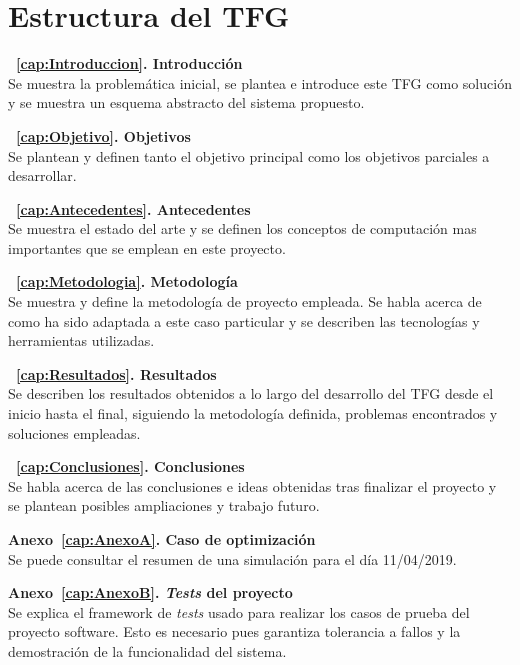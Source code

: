 \section{Estructura del TFG}
\begin{description}
\item \textbf{~\ref{cap:Introduccion}. Introducción}\\
  Se muestra la problemática inicial, se plantea e introduce este \gls{TFG} como solución y se muestra un esquema abstracto del sistema propuesto.
\item \textbf{~\ref{cap:Objetivo}. Objetivos}\\
  Se plantean y definen tanto el objetivo principal como los objetivos parciales a desarrollar.
\item \textbf{~\ref{cap:Antecedentes}. Antecedentes}\\
  Se muestra el estado del arte y se definen los conceptos de computación mas importantes que se emplean en este proyecto.
\item \textbf{~\ref{cap:Metodologia}. Metodología}\\
  Se muestra y define la metodología de proyecto empleada. Se habla acerca de como ha sido adaptada a este caso particular y se describen las tecnologías y herramientas utilizadas.
\item \textbf{~\ref{cap:Resultados}. Resultados}\\
  Se describen los resultados obtenidos a lo largo del desarrollo del \gls{TFG} desde el inicio hasta el final, siguiendo la metodología definida, problemas encontrados y soluciones empleadas.
\item \textbf{~\ref{cap:Conclusiones}. Conclusiones}\\
  Se habla acerca de las conclusiones e ideas obtenidas tras finalizar el proyecto y se plantean posibles ampliaciones y trabajo futuro.
\item \textbf{Anexo~\ref{cap:AnexoA}. Caso de optimización}\\
  Se puede consultar el resumen de una simulación para el día 11/04/2019.
\item \textbf{Anexo~\ref{cap:AnexoB}. \textit{Tests} del proyecto}\\
  Se explica el framework de \textit{tests} usado para realizar los casos de prueba del proyecto software. Esto es necesario pues garantiza tolerancia a fallos y la demostración de la funcionalidad del sistema.
\end{description}
